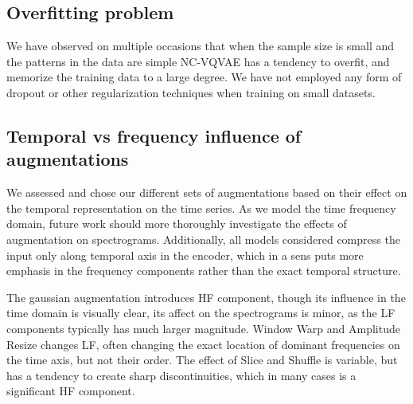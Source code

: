 \documentclass[../../thesis.tex]{subfiles}
\begin{document}
\subsection{Overfitting problem}

We have observed on multiple occasions that when the sample size is small and the patterns in the data are simple NC-VQVAE has a tendency to overfit, and memorize the training data to a large degree. We have not employed any form of dropout or other regularization techniques when training on small datasets. 

\subsection{Temporal vs frequency influence of augmentations}
We assessed and chose our different sets of augmentations based on their effect on the temporal representation on the time series. As we model the time frequency domain, future work should more thoroughly investigate the effects of augmentation on spectrograms. Additionally, all models considered compress the input only along temporal axis in the encoder, which in a sens puts more emphasis in the frequency components rather than the exact temporal structure. \newline

The  gaussian augmentation introduces HF component, though its influence in the time domain is visually clear, its affect on the spectrograms is minor, as the LF components typically has much larger magnitude. Window Warp and Amplitude Resize changes LF, often changing the exact location of dominant frequencies on the time axis, but not their order. The effect of Slice and Shuffle is variable, but has a tendency to create sharp discontinuities, which in many cases is a significant HF component.
\end{document}

